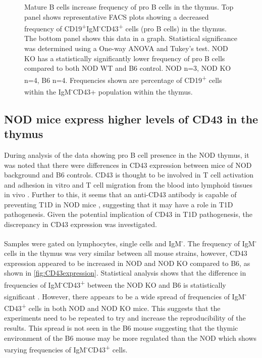 \begin{figure}
\begin{subfigure}{\textwidth}
	\end{subfigure}
\caption{Mature B cells increase frequency of pro B cells in the thymus.
Top panel shows representative FACS plots showing a decreased frequency of CD19\textsuperscript{+}IgM\textsuperscript{-}CD43\textsuperscript{+} cells (pro B cells) in the thymus.
The bottom panel shows this data in a graph.
Statistical significance was determined using a One-way ANOVA and Tukey's test. NOD KO has a statistically significantly lower frequency of pro B cells compared to both NOD WT and B6 control. NOD n=3, NOD KO n=4, B6 n=4. Frequencies shown are percentage of CD19\textsuperscript{+} cells within the IgM\textsuperscript{-}CD43{+} population within the thymus.}
\label{fig:MatureBincProB}
\end{figure}


\subsection{NOD mice express higher levels of CD43 in the thymus}
\label{Results:CD43}

During analysis of the data showing pro B cell presence in the NOD thymus, it was noted that there were differences in CD43 expression between mice of NOD background and B6 controls.
CD43 is thought to be involved in T cell activation and adhesion in vitro \citep{McEvoy1997} and T cell migration from the blood into lymphoid tissues in vivo \citep{Johnson1999}.
Further to this, it seems that an anti-CD43 antibody is capable of preventing T1D in NOD mice \citep{Johnson1999}, suggesting that it may have a role in T1D pathogenesis.
Given the potential implication of CD43 in T1D pathogenesis, the discrepancy in CD43 expression was investigated.

Samples were gated on lymphocytes, single cells and IgM\textsuperscript{-}.
The frequency of IgM\textsuperscript{-} cells in the thymus was very similar between all mouse strains, however, CD43 expression appeared to be increased in NOD and NOD KO compared to B6, as shown in \cref{fig:CD43expression}.
Statistical analysis shows that the difference in frequencies of IgM\textsuperscript{-}CD43\textsuperscript{+} between the NOD KO and B6 is statistically significant .
However, there appears to be a wide spread of frequencies of IgM\textsuperscript{-}CD43\textsuperscript{+} cells in both NOD and NOD KO mice.
This suggests that the experiments need to be repeated to try and increase the reproducibility of the results.
This spread is not seen in the B6 mouse suggesting that the thymic environment of the B6 mouse may be more regulated than the NOD which shows varying frequencies of IgM\textsuperscript{-}CD43\textsuperscript{+} cells.

